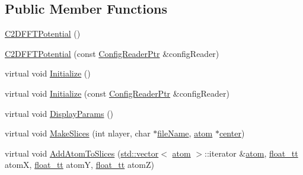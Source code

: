 \subsection*{Public Member Functions}
\begin{DoxyCompactItemize}
\item 
\hyperlink{class_q_s_t_e_m_1_1_c2_d_f_f_t_potential_a45ff51f59eb26a3d6a198f106ccbc0e9}{C2\-D\-F\-F\-T\-Potential} ()
\item 
\hyperlink{class_q_s_t_e_m_1_1_c2_d_f_f_t_potential_ac4553b8d73dff87271f90d37174f55e8}{C2\-D\-F\-F\-T\-Potential} (const \hyperlink{namespace_q_s_t_e_m_af9424707fe9f6503298f49b41304bd35}{Config\-Reader\-Ptr} \&config\-Reader)
\item 
virtual void \hyperlink{class_q_s_t_e_m_1_1_c2_d_f_f_t_potential_aa9a2f23721a830c84c2dc14f5500691b}{Initialize} ()
\item 
virtual void \hyperlink{class_q_s_t_e_m_1_1_c2_d_f_f_t_potential_a0ab9af1821ef81c0766355550d959a30}{Initialize} (const \hyperlink{namespace_q_s_t_e_m_af9424707fe9f6503298f49b41304bd35}{Config\-Reader\-Ptr} \&config\-Reader)
\item 
virtual void \hyperlink{class_q_s_t_e_m_1_1_c2_d_f_f_t_potential_a30d5fe937230d99bf2abeec066d2358a}{Display\-Params} ()
\item 
virtual void \hyperlink{class_q_s_t_e_m_1_1_c2_d_f_f_t_potential_aa4ee28a110118f60fbdca12e6e5f259d}{Make\-Slices} (int nlayer, char $\ast$\hyperlink{qmb_8m_a7a230f02bdffebd1357e3c0b49e01271}{file\-Name}, \hyperlink{namespace_q_s_t_e_m_a402dabc31a7a1fe906d0cdd138c69686}{atom} $\ast$\hyperlink{_displacement_params_8m_a02389a9bda512aa8f8a3345f4fa27f25}{center})
\item 
virtual void \hyperlink{class_q_s_t_e_m_1_1_c2_d_f_f_t_potential_a03242b69412f5aaf09a9a03defc46102}{Add\-Atom\-To\-Slices} (\hyperlink{qmb_8m_af54b69a32590de218622e869b06b47b3}{std\-::vector}$<$ \hyperlink{namespace_q_s_t_e_m_a402dabc31a7a1fe906d0cdd138c69686}{atom} $>$\-::iterator \&\hyperlink{namespace_q_s_t_e_m_a402dabc31a7a1fe906d0cdd138c69686}{atom}, \hyperlink{namespace_q_s_t_e_m_a915d7caa497280d9f927c4ce8d330e47}{float\-\_\-tt} atom\-X, \hyperlink{namespace_q_s_t_e_m_a915d7caa497280d9f927c4ce8d330e47}{float\-\_\-tt} atom\-Y, \hyperlink{namespace_q_s_t_e_m_a915d7caa497280d9f927c4ce8d330e47}{float\-\_\-tt} atom\-Z)
\end{DoxyCompactItemize}
